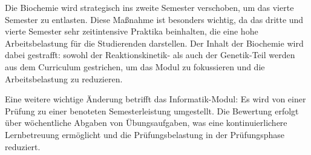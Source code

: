 \documentclass[a4paper]{article}
\begin{document}
Die Biochemie wird strategisch ins zweite Semester verschoben, um das vierte Semester zu entlasten. Diese Maßnahme ist besonders wichtig, da das dritte und vierte Semester sehr zeitintensive Praktika beinhalten, die eine hohe Arbeitsbelastung für die Studierenden darstellen. Der Inhalt der Biochemie wird dabei gestrafft: sowohl der Reaktionskinetik- als auch der Genetik-Teil werden aus dem Curriculum gestrichen, um das Modul zu fokussieren und die Arbeitsbelastung zu reduzieren.

Eine weitere wichtige Änderung betrifft das Informatik-Modul: Es wird von einer Prüfung zu einer benoteten Semesterleistung umgestellt. Die Bewertung erfolgt über wöchentliche Abgaben von Übungsaufgaben, was eine kontinuierlichere Lernbetreuung ermöglicht und die Prüfungsbelastung in der Prüfungsphase reduziert.

\renewcommand{\arraystretch}{1.2}
\end{document}
